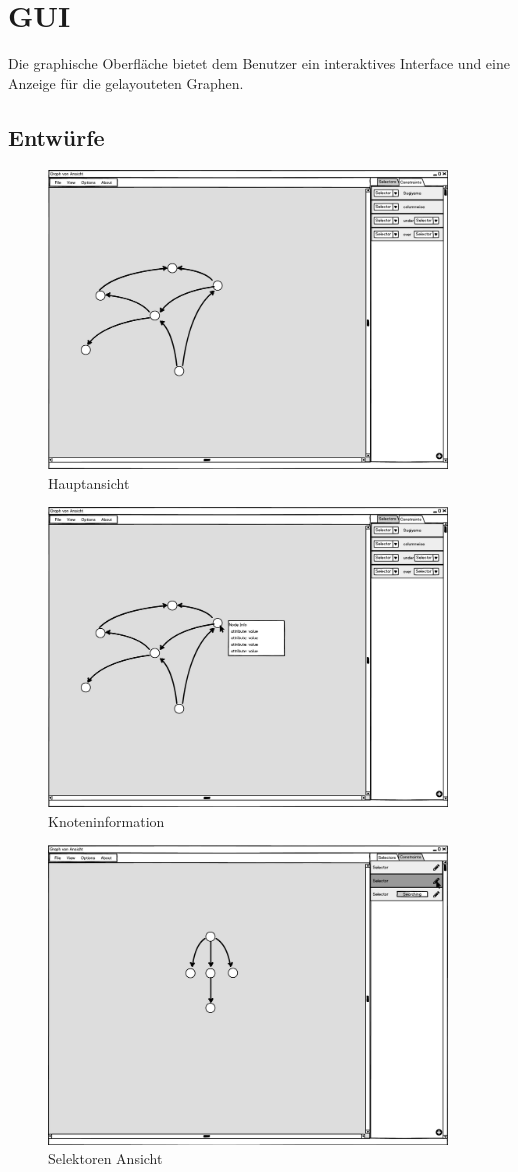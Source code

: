\section{GUI}\label{sec:uigui}

Die graphische Oberfläche bietet dem Benutzer ein interaktives Interface und eine Anzeige für die gelayouteten Graphen. %

\subsection{Entwürfe}

\begin{figure}[ht]
  \centering
  \includegraphics[width=300pt]{resourcen/main.png}
  \caption{Hauptansicht}
  \label{fig:mainView}
\end{figure}

\begin{figure}[ht]
  \centering
  \includegraphics[width=300pt]{resourcen/nodeInfo.png}
  \caption{Knoteninformation}
  \label{fig:nodeInfo}
\end{figure}

\begin{figure}[ht]
  \centering
  \includegraphics[width=300pt]{resourcen/selectSelector.png}
  \caption{Selektoren Ansicht}
  \label{fig:selectorView}
\end{figure}